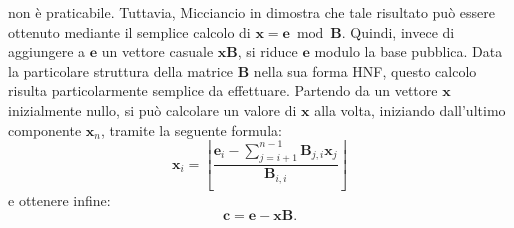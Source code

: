 non è praticabile. Tuttavia, Micciancio in \cite[sezione 4.1]{HNF01} dimostra che tale 
risultato può essere ottenuto mediante il semplice calcolo di 
$\mathbf{x} = \mathbf{e} \bmod \mathbf{B}$. Quindi, invece di aggiungere a $\mathbf{e}$ un
vettore casuale $\mathbf{x}\mathbf{B}$, si riduce $\mathbf{e}$ modulo la base pubblica.
Data la particolare struttura della matrice 
$\mathbf{B}$ nella sua forma HNF, questo calcolo risulta particolarmente 
semplice da effettuare. Partendo da un vettore $\mathbf{x}$
inizialmente nullo, si può calcolare un valore di $\mathbf{x}$ alla volta, iniziando dall'ultimo
componente $\mathbf{x}_n$, tramite la seguente formula:
\begin{equation}
    \label{eq:HNFreduction}
    \mathbf{x}_i = \left\lfloor \frac{\mathbf{e}_i - 
    \sum_{j=i+1}^{n-1} \mathbf{B}_{j,i} \mathbf{x}_j}{\mathbf{B}_{i,i}} \right\rfloor
\end{equation}
e ottenere infine:
\begin{equation}
    \label{eq:HNFencryption}
    \mathbf{c} = \mathbf{e} - \mathbf{x}\mathbf{B}.
\end{equation}

